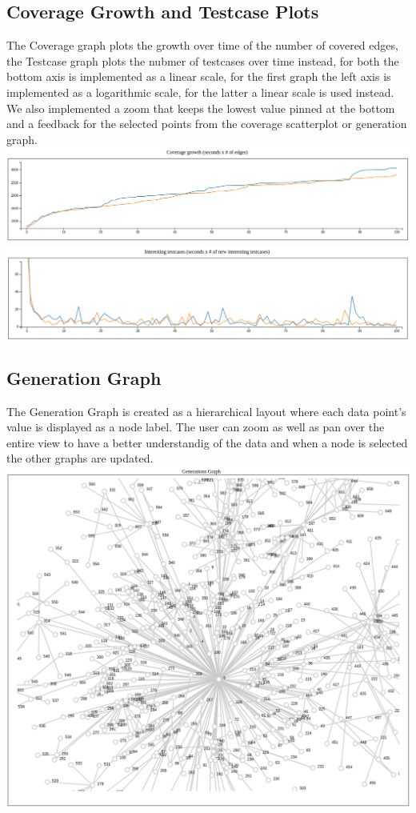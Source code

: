 \documentclass[conference,compsoc]{IEEEtran}
\begin{document}
\subsection{Coverage Growth and Testcase Plots}
The Coverage graph plots the growth over time of the number of covered edges, the Testcase graph plots the nubmer of testcases over time instead, for both the bottom axis is implemented as a linear scale, for the first graph the left axis is implemented as a logarithmic scale, for the latter a linear scale is used instead.
We also implemented a zoom that keeps the lowest value pinned at the bottom and a feedback for the selected points from the coverage scatterplot or generation graph.
\includegraphics[scale=0.3]{img/coverage}
\includegraphics[scale=0.3]{img/inputs}

\subsection{Generation Graph}
The Generation Graph is created as a hierarchical layout where each data point's value is displayed as a node label. The user can zoom as well as pan over the entire view to have a better understandig of the data and when a node is selected the other graphs are updated.
\includegraphics[scale=0.2]{img/tree}
\end{document}
